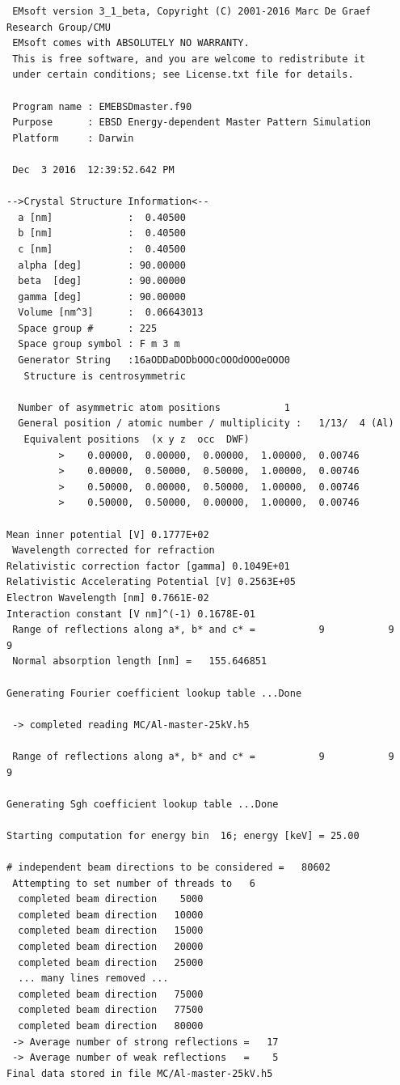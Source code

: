 \documentclass[DIV=calc, paper=letter, fontsize=11pt]{scrartcl}	 %
\begin{document}
\begin{verbatim}
 EMsoft version 3_1_beta, Copyright (C) 2001-2016 Marc De Graef Research Group/CMU
 EMsoft comes with ABSOLUTELY NO WARRANTY.
 This is free software, and you are welcome to redistribute it
 under certain conditions; see License.txt file for details.

 Program name : EMEBSDmaster.f90
 Purpose      : EBSD Energy-dependent Master Pattern Simulation
 Platform     : Darwin

 Dec  3 2016  12:39:52.642 PM

-->Crystal Structure Information<--
  a [nm]             :  0.40500
  b [nm]             :  0.40500
  c [nm]             :  0.40500
  alpha [deg]        : 90.00000
  beta  [deg]        : 90.00000
  gamma [deg]        : 90.00000
  Volume [nm^3]      :  0.06643013
  Space group #      : 225
  Space group symbol : F m 3 m
  Generator String   :16aODDaDODbOOOcOOOdOOOeOOO0
   Structure is centrosymmetric

  Number of asymmetric atom positions           1
  General position / atomic number / multiplicity :   1/13/  4 (Al)
   Equivalent positions  (x y z  occ  DWF)
         >    0.00000,  0.00000,  0.00000,  1.00000,  0.00746
         >    0.00000,  0.50000,  0.50000,  1.00000,  0.00746
         >    0.50000,  0.00000,  0.50000,  1.00000,  0.00746
         >    0.50000,  0.50000,  0.00000,  1.00000,  0.00746

Mean inner potential [V] 0.1777E+02
 Wavelength corrected for refraction
Relativistic correction factor [gamma] 0.1049E+01
Relativistic Accelerating Potential [V] 0.2563E+05
Electron Wavelength [nm] 0.7661E-02
Interaction constant [V nm]^(-1) 0.1678E-01
 Range of reflections along a*, b* and c* =           9           9           9
 Normal absorption length [nm] =   155.646851    

Generating Fourier coefficient lookup table ...Done

 -> completed reading MC/Al-master-25kV.h5

 Range of reflections along a*, b* and c* =           9           9           9

Generating Sgh coefficient lookup table ...Done

Starting computation for energy bin  16; energy [keV] = 25.00

# independent beam directions to be considered =   80602
 Attempting to set number of threads to   6
  completed beam direction    5000
  completed beam direction   10000
  completed beam direction   15000
  completed beam direction   20000
  completed beam direction   25000
  ... many lines removed ...
  completed beam direction   75000
  completed beam direction   77500
  completed beam direction   80000
 -> Average number of strong reflections =   17
 -> Average number of weak reflections   =    5
Final data stored in file MC/Al-master-25kV.h5
\end{verbatim}
\end{document}
